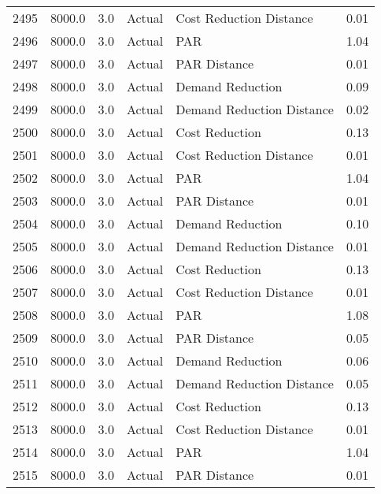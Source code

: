 \begin{longtable}{lrrllr}
2495 &       8000.0 &     3.0 &         Actual &    Cost Reduction Distance &   0.01 \\
2496 &       8000.0 &     3.0 &         Actual &                        PAR &   1.04 \\
2497 &       8000.0 &     3.0 &         Actual &               PAR Distance &   0.01 \\
2498 &       8000.0 &     3.0 &         Actual &           Demand Reduction &   0.09 \\
2499 &       8000.0 &     3.0 &         Actual &  Demand Reduction Distance &   0.02 \\
2500 &       8000.0 &     3.0 &         Actual &             Cost Reduction &   0.13 \\
2501 &       8000.0 &     3.0 &         Actual &    Cost Reduction Distance &   0.01 \\
2502 &       8000.0 &     3.0 &         Actual &                        PAR &   1.04 \\
2503 &       8000.0 &     3.0 &         Actual &               PAR Distance &   0.01 \\
2504 &       8000.0 &     3.0 &         Actual &           Demand Reduction &   0.10 \\
2505 &       8000.0 &     3.0 &         Actual &  Demand Reduction Distance &   0.01 \\
2506 &       8000.0 &     3.0 &         Actual &             Cost Reduction &   0.13 \\
2507 &       8000.0 &     3.0 &         Actual &    Cost Reduction Distance &   0.01 \\
2508 &       8000.0 &     3.0 &         Actual &                        PAR &   1.08 \\
2509 &       8000.0 &     3.0 &         Actual &               PAR Distance &   0.05 \\
2510 &       8000.0 &     3.0 &         Actual &           Demand Reduction &   0.06 \\
2511 &       8000.0 &     3.0 &         Actual &  Demand Reduction Distance &   0.05 \\
2512 &       8000.0 &     3.0 &         Actual &             Cost Reduction &   0.13 \\
2513 &       8000.0 &     3.0 &         Actual &    Cost Reduction Distance &   0.01 \\
2514 &       8000.0 &     3.0 &         Actual &                        PAR &   1.04 \\
2515 &       8000.0 &     3.0 &         Actual &               PAR Distance &   0.01 \\

\end{longtable}
